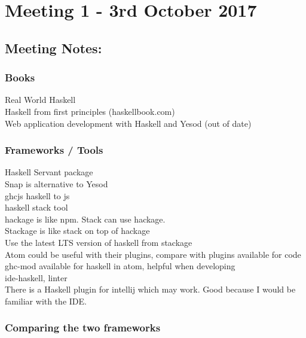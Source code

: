 \section{Meeting 1 - 3rd October 2017}

\subsection{Meeting Notes:}

\subsubsection{Books}

Real World Haskell\\
Haskell from first principles (haskellbook.com)\\
Web application development with Haskell and Yesod (out of date)

\subsubsection{Frameworks / Tools}

Haskell Servant package\\
Snap is alternative to Yesod\\
ghcjs haskell to js\\
haskell stack tool\\
hackage is like npm. Stack can use hackage.\\
Stackage is like stack on top of hackage\\
Use the latest LTS version of haskell from stackage\\
Atom could be useful with their plugins, compare with plugins available for code\\
ghc-mod available for haskell in atom, helpful when developing\\
ide-haskell, linter\\
There is a Haskell plugin for intellij which may work. Good because I would be familiar with the IDE.

\subsubsection{Comparing the two frameworks}

